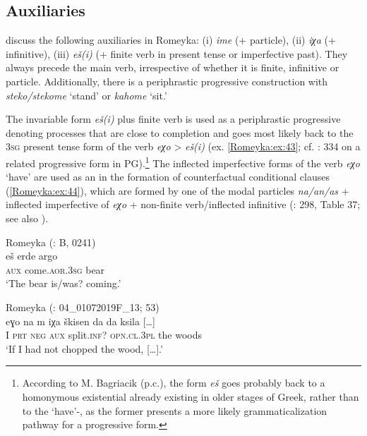 \documentclass[output=paper,colorlinks,citecolor=brown]{langscibook}
\begin{document}
\subsection{Auxiliaries}\label{Romeyka:ss:4.6}

\citet{neocleousNever2022} discuss the following auxiliaries in Romeyka: 
(i) \textit{ime} (+ particle), 
(ii) \textit{iχa} (+ infinitive), 
(iii) \textit{eš(i)} (+ finite verb in present tense or imperfective past). 
They always precede the main verb, irrespective of whether it is finite, infinitive or particle. Additionally, there is a periphrastic progressive construction with \textit{steko/stekome} `stand' or \textit{kahome} `sit.'

The invariable form \textit{eš(i)} plus finite verb is used as a periphrastic progressive denoting processes that are close to completion and goes most likely back to the \textsc{3sg} present tense form of the verb \textit{eχo} > \textit{eš(i)} (ex. \ref{Romeyka:ex:43}; cf. \citealt{drettasPontic1997}: 334 on a related progressive form in PG).\footnote{According to M. Bagriacik (p.c.), the form \textit{eš} goes probably back to a homonymous existential  already existing in older stages of Greek, rather than to the `have'-, as the former presents a more likely grammaticalization pathway for a progressive form.} The inflected imperfective forms of the verb \textit{eχo} `have' are used as an  in the formation of counterfactual conditional clauses (\ref{Romeyka:ex:44}), which are formed by one of the modal particles \textit{na/an/as} + inflected imperfective of \textit{eχo} + non-finite verb/inflected infinitive (\citealt{schreibergrammar2022}: 298, Table 37; see also \citealt{sitaridouModality2014}).

\ea\label{Romeyka:ex:43}
Romeyka (\citealt{schreiber2021pontic}: B, 0241) \\
\gll eš erde argo \\
\textsc{aux} come\textsc{.aor.3sg} bear \\
\glt 	`The bear is/was? coming.'  \\
\z

\ea\label{Romeyka:ex:44}
Romeyka (\citealt{schreiber_inprep}: 04\_01072019F\_13; 53) \\
\gll eɣo na m iχa škisen da\textup{\footnotemark} da ksila […] \\
I \textsc{prt} \textsc{neg} \textsc{aux} split\textsc{.inf?} \textsc{opn.cl.3pl} the woods \\
\glt `If I had not chopped the wood, […].'  \\
\z
\end{document}
